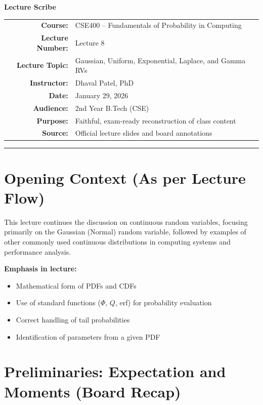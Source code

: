 \documentclass[11pt]{article}
\begin{document}
\begin{center}
    {\Large \textbf{Lecture Scribe}} \\
    \vspace{0.3cm}
    \begin{tabular}{rl}
        \textbf{Course:} & CSE400 – Fundamentals of Probability in Computing \\
        \textbf{Lecture Number:} & Lecture 8 \\
        \textbf{Lecture Topic:} & Gaussian, Uniform, Exponential, Laplace, and Gamma RVs \\
        \textbf{Instructor:} & Dhaval Patel, PhD \\
        \textbf{Date:} & January 29, 2026 \\
        \textbf{Audience:} & 2nd Year B.Tech (CSE) \\
        \textbf{Purpose:} & Faithful, exam-ready reconstruction of class content \\
        \textbf{Source:} & Official lecture slides and board annotations
    \end{tabular}
\end{center}
\hrule
\vspace{0.5cm}


\section{Opening Context (As per Lecture Flow)}
This lecture continues the discussion on continuous random variables, focusing primarily on the Gaussian (Normal) random variable, followed by examples of other commonly used continuous distributions in computing systems and performance analysis.

\noindent \textbf{Emphasis in lecture:}
\begin{itemize}
    \item Mathematical form of PDFs and CDFs
    \item Use of standard functions ($\Phi$, $Q$, erf) for probability evaluation
    \item Correct handling of tail probabilities
    \item Identification of parameters from a given PDF
\end{itemize}

\section{Preliminaries: Expectation and Moments (Board Recap)}
\end{document}
